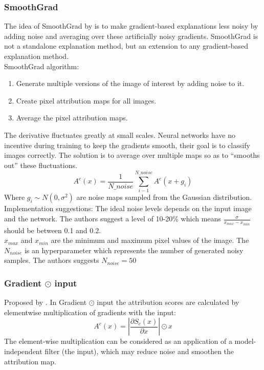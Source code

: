 \subsubsection{SmoothGrad}
The idea of SmoothGrad by \cite{DBLP:journals/corr/SmilkovTKVW17} is to make gradient-based explanations less
noisy by adding noise and averaging over these artificially noisy gradients. SmoothGrad is not a standalone explanation method, but an extension to any gradient-based
explanation method.\\

SmoothGrad algorithm:
\begin{enumerate}
    \item Generate multiple versions of the image of interest by adding noise to it.
    \item Create pixel attribution maps for all images.
    \item Average the pixel attribution maps.
\end{enumerate}

The derivative fluctuates greatly at small scales. Neural networks have no incentive during training
to keep the gradients smooth, their goal is to classify images correctly. The solution is to average over multiple maps so as to “smooths out” these fluctuations.\\
\begin{equation*}
    A^c(x) = \frac{1}{N\_noise}\sum_{i-1}^{N\_noise} A^c(x+g_i)
\end{equation*}
Where $g_i\sim N(0, \sigma^2)$ are noise maps sampled from the Gaussian distribution.\\

Implementation suggestions: The ideal noise levels depends on the input image and the network. The authors suggest a level of 10-20\% which means $\frac{\sigma}{x_{max}-x_{min}}$ should be between 0.1 and 0.2.\\
$x_{max}$ and $x_{min}$ are the minimum and maximum pixel values of the image. The $N_{noise}$ is an hyperparameter which represents the number of generated noisy samples. The authors suggests $N_{noise}=50$

\subsubsection{Gradient $\odot$ input}
Proposed by \cite{DBLP:journals/corr/ShrikumarGSK16}. In Gradient $\odot$ input the attribution scores are calculated by elementwise multiplication of gradients with the input:
\begin{equation*}
    A^c(x) = |\frac{\partial S_c(x)}{\partial x}| \odot x
\end{equation*}
The element-wise multiplication can be considered as an application of a model-independent filter
(the input), which may reduce noise and smoothen the attribution map.


